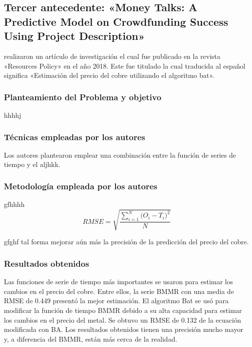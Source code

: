 \subsection{Tercer antecedente: «Money Talks: A Predictive Model on Crowdfunding Success Using Project Description» \citep*{pr_zhou2018projectdesc}}
\citeauthor{pr_zhou2018projectdesc} realizaron un artículo de investigación el cual fue publicado en la revista «Resources Policy» en el año 2018. Este fue titulado  la cual traducida al español significa «Estimación del precio del cobre utilizando el algoritmo bat».

\subsubsection{Planteamiento del Problema y objetivo }
hhhhj

\subsubsection{Técnicas empleadas por los autores}
Los autores plantearon emplear una combinación entre la función de series de tiempo y el aljhkk. 

\subsubsection{Metodología empleada por los autores}
gfhhhh
\begin{equation}  
\label{eq:RMSE}
RMSE = \sqrt{\frac{\sum_{i=1}^{N}{\Big(O_i -T_i\Big)^2}}{N}}
\end{equation}

gfghf tal forma mejorar aún más la precisión de la predicción del precio del cobre.

\subsubsection{Resultados obtenidos}
Las funciones de serie de tiempo más importantes se usaron para estimar los cambios en el precio del cobre. Entre ellos, la serie BMMR con una media de RMSE de 0.449 presentó la mejor estimación. El algoritmo Bat  se usó para modificar la función de tiempo BMMR debido a su alta capacidad para estimar los cambios en el precio del metal. Se obtuvo un RMSE de 0.132 de la ecuación modificada con BA. Los resultados obtenidos tienen una precisión mucho mayor y, a diferencia del BMMR, están más cerca de la realidad.


